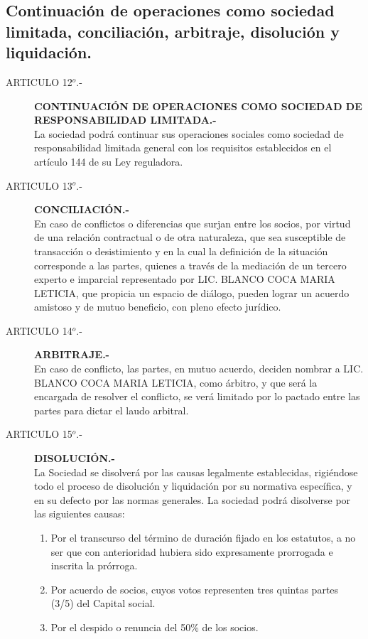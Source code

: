 \documentclass[11pt,letterpaper]{report}
\begin{document}
\subsection{ Continuaci\'on de operaciones como sociedad limitada, conciliaci\'on, arbitraje, disoluci\'on y liquidaci\'on. }

\begin{description}
\item[ARTICULO 12$^{o}$.-]{\bf CONTINUACI\'ON DE OPERACIONES COMO SOCIEDAD DE RESPONSABILIDAD
LIMITADA.-}\\
La sociedad podr\'a continuar sus operaciones sociales como sociedad de responsabilidad limitada general con los requisitos establecidos en el art\'iculo 144 de su Ley reguladora.

\item[ARTICULO 13$^{o}$.-]{\bf CONCILIACI\'ON.- }\\ En caso de conflictos o diferencias que surjan entre los socios, por virtud de una relaci\'on contractual o de otra naturaleza, que sea susceptible de transacci\'on o desistimiento y en la cual la definici\'on de la situaci\'on corresponde a las partes, quienes a trav\'es de la mediaci\'on de un tercero experto e imparcial representado por LIC. BLANCO COCA MARIA LETICIA, que propicia un espacio de di\'alogo, pueden lograr un acuerdo amistoso y de mutuo beneficio, con pleno efecto jur\'idico.\\
\item[ARTICULO 14$^{o}$.-]{\bf ARBITRAJE.- }\\ En caso de conflicto, las partes, en mutuo acuerdo, deciden nombrar a LIC. BLANCO COCA MARIA LETICIA, como \'arbitro, y que ser\'a la encargada de resolver el conflicto, se ver\'a limitado por lo pactado entre las partes para dictar el laudo arbitral.

\item[ARTICULO 15$^{o}$.-]{\bf DISOLUCI\'ON.-}\\La Sociedad se disolver\'a por las causas legalmente establecidas, rigi\'endose todo el proceso de disoluci\'on y liquidaci\'on por su normativa espec\'ifica, y en su defecto por las normas generales. La sociedad podr\'a disolverse por las siguientes causas:
\begin{enumerate}
\item Por el transcurso del t\'ermino de duraci\'on fijado en los estatutos, a no ser que con anterioridad hubiera sido expresamente prorrogada e inscrita la pr\'orroga.
\item Por acuerdo de socios, cuyos votos representen tres quintas partes (3/5) del Capital social.
\item Por el despido o renuncia del 50\% de los socios.
\end{enumerate}


\end{description}
\end{document}
